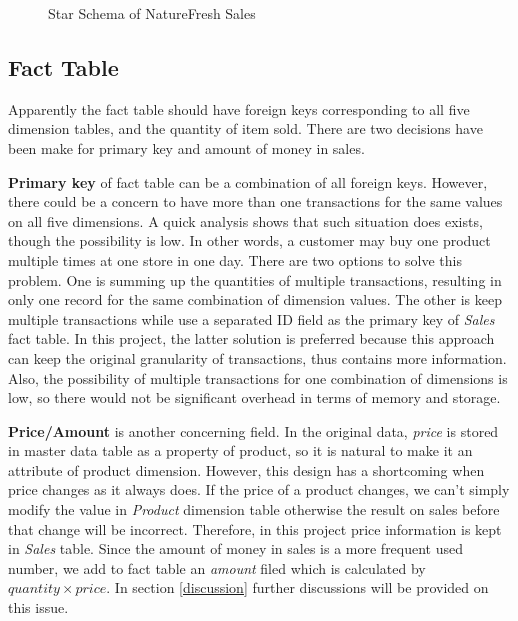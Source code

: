 \documentclass[
  12pt,
  a4paper,
]{article}
\begin{document}
\begin{figure}[htbp]
  \centering
  { %
  \fontsize{9}{10}\selectfont
  \def\svgwidth{0.9\columnwidth}
    \resizebox{0.9\textwidth}{!}{}
  }
  \caption{Star Schema of NatureFresh Sales}
  \label{fig:overall}
\end{figure}

\hypertarget{fact-table}{%
\subsection{Fact Table}\label{fact-table}}

Apparently the fact table should have foreign keys corresponding to all
five dimension tables, and the quantity of item sold. There are two
decisions have been make for primary key and amount of money in sales.

\textbf{Primary key} of fact table can be a combination of all foreign
keys. However, there could be a concern to have more than one
transactions for the same values on all five dimensions. A quick
analysis shows that such situation does exists, though the possibility
is low. In other words, a customer may buy one product multiple times at
one store in one day. There are two options to solve this problem. One
is summing up the quantities of multiple transactions, resulting in only
one record for the same combination of dimension values. The other is
keep multiple transactions while use a separated ID field as the primary
key of \emph{Sales} fact table. In this project, the latter solution is
preferred because this approach can keep the original granularity of
transactions, thus contains more information. Also, the possibility of
multiple transactions for one combination of dimensions is low, so there
would not be significant overhead in terms of memory and storage.

\textbf{Price/Amount} is another concerning field. In the original data,
\emph{price} is stored in master data table as a property of product, so
it is natural to make it an attribute of product dimension. However,
this design has a shortcoming when price changes as it always does. If
the price of a product changes, we can't simply modify the value in
\emph{Product} dimension table otherwise the result on sales before that
change will be incorrect. Therefore, in this project price information
is kept in \emph{Sales} table. Since the amount of money in sales is a
more frequent used number, we add to fact table an \emph{amount} filed
which is calculated by \(\mathit{quantity}\times \mathit{price}\). In
section \ref{discussion} further discussions will be provided on this
issue.
\end{document}
